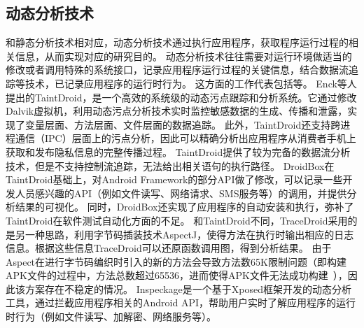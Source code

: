 

\subsection{动态分析技术}

和静态分析技术相对应，动态分析技术通过执行应用程序，获取程序运行过程的相关信息，从而实现对应的研究目的。
动态分析技术往往需要对运行环境做适当的修改或者调用特殊的系统接口，记录应用程序运行过程的关键信息，结合数据流追踪等技术，已记录应用程序的运行时行为。
这方面的工作代表包括\cite{chun2014taintdroid,droidbox:online,van2013dynamic,droidscope}等。
Enck等人提出的TaintDroid\cite{chun2014taintdroid}，是一个高效的系统级的动态污点跟踪和分析系统。它通过修改Dalvik虚拟机，利用动态污点分析技术实时监控敏感数据的生成、传播和泄露，实现了变量层面、方法层面、文件层面的数据追踪。
此外，TaintDroid还支持跨进程通信（IPC）层面上的污点分析，因此可以精确分析出应用程序从消费者手机上获取和发布隐私信息的完整传播过程。
TaintDroid提供了较为完备的数据流分析技术，但是不支持控制流追踪，无法给出相关语句的执行路径。
DroidBox\cite{droidbox:online}在TaintDroid基础上，对Android Framework的部分API做了修改，可以记录一些开发人员感兴趣的API（例如文件读写、网络请求、SMS服务等）的调用，并提供分析结果的可视化。
同时，DroidBox还实现了应用程序的自动安装和执行，弥补了TaintDroid在软件测试自动化方面的不足。
和TaintDroid不同，TraceDroid\cite{van2013dynamic}采用的是另一种思路，利用字节码插装技术AspectJ，使得方法在执行时输出相应的日志信息。根据这些信息TraceDroid可以还原函数调用图，得到分析结果。
由于Aspect在进行字节码编织时引入的新的方法会导致方法数65K限制问题（即构建APK文件的过程中，方法总数超过65536，进而使得APK文件无法成功构建~\cite{Configur27}），因此该方案存在不稳定的情况。
Inspeckage\cite{acpmInsp34}是一个基于Xposed框架开发的动态分析工具，通过拦截应用程序相关的Android API，帮助用户实时了解应用程序的运行时行为（例如文件读写、加解密、网络服务等）。
